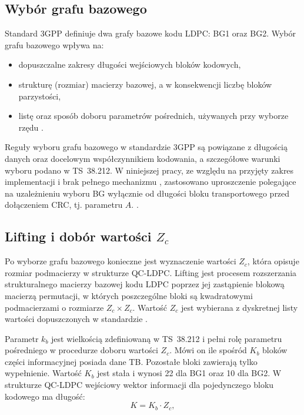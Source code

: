 \subsection{Wybór grafu bazowego}
Standard 3GPP definiuje dwa grafy bazowe kodu LDPC: BG1 oraz BG2. Wybór grafu bazowego wpływa na:
\begin{itemize}
  \item dopuszczalne zakresy długości wejściowych bloków kodowych,
  \item strukturę (rozmiar) macierzy bazowej, a w konsekwencji liczbę bloków parzystości,
  \item listę oraz sposób doboru parametrów pośrednich, używanych przy wyborze rzędu .
\end{itemize}
Reguły wyboru grafu bazowego w standardzie 3GPP są powiązane z długością danych oraz docelowym współczynnikiem kodowania, a szczegółowe warunki wyboru podano w TS~38.212. W niniejszej pracy, ze względu na przyjęty zakres implementacji i brak pełnego mechanizmu , zastosowano uproszczenie polegające na uzależnieniu wyboru BG wyłącznie od długości bloku transportowego przed dołączeniem CRC, tj. parametru $A$. \cite{bib:3gpp_38212}.

\subsection{Lifting i dobór wartości $Z_c$}
Po wyborze grafu bazowego konieczne jest wyznaczenie wartości $Z_c$, która opisuje rozmiar podmacierzy w strukturze QC-LDPC. Lifting jest procesem rozszerzania strukturalnego macierzy bazowej kodu LDPC poprzez jej zastąpienie blokową macierzą permutacji, w których poszczególne bloki są kwadratowymi podmacierzami o rozmiarze $Z_c \times Z_c$. Wartość $Z_c$ jest wybierana z dyskretnej listy wartości dopuszczonych w standardzie \cite{bib:3gpp_38212}.

Parametr $k_b$ jest wielkością zdefiniowaną w TS~38.212 i pełni rolę parametru pośredniego w procedurze doboru wartości $Z_c$. Mówi on ile spośród $K_b$ bloków części informacyjnej posiada dane TB. Pozostałe bloki zawierają tylko wypełnienie. Wartość $K_b$ jest stała i wynosi 22 dla BG1 oraz 10 dla BG2. W strukturze QC-LDPC wejściowy wektor informacji dla pojedynczego bloku kodowego ma długość:
\begin{equation}
K = K_b \cdot Z_c,
\label{eq:K_kbZc}
\end{equation}

